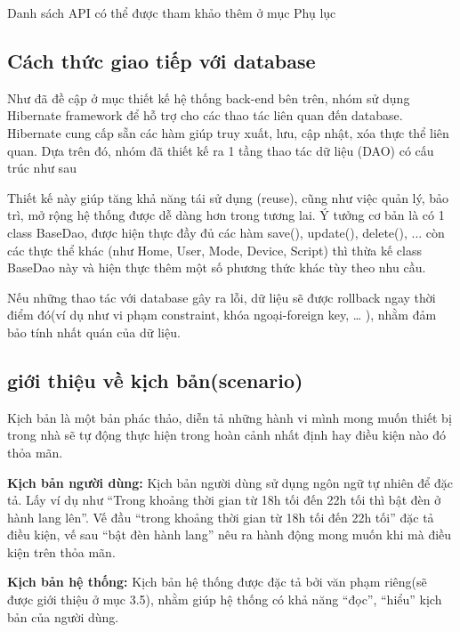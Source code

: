 \documentclass[11pt,a4paper,oneside]{book}
\begin{document}
Danh sách API có thể được tham khảo thêm ở mục Phụ lục

\subsection{Cách thức giao tiếp với database}
Như đã đề cập ở mục thiết kế hệ thống back-end bên trên, nhóm sử dụng Hibernate framework để hỗ trợ cho các thao tác liên quan đến database. Hibernate cung cấp sẵn các hàm giúp truy xuất, lưu, cập nhật, xóa thực thể liên quan. Dựa trên đó, nhóm đã thiết kế ra 1 tầng thao tác dữ liệu (DAO) có cấu trúc như sau

%    

Thiết kế này giúp tăng khả năng tái sử dụng (reuse), cũng như việc quản lý, bảo trì, mở rộng hệ thống được dễ dàng hơn trong tương lai. Ý tưởng cơ bản là có 1 class BaseDao, được hiện thực đầy đủ các hàm save(), update(), delete(), ... còn các thực thể khác (như Home, User, Mode, Device, Script) thì thừa kế class BaseDao này và hiện thực thêm một số phương thức khác tùy theo nhu cầu.

Nếu những thao tác với database gây ra lỗi, dữ liệu sẽ được rollback ngay thời điểm đó(ví dụ như vi phạm constraint, khóa ngoại-foreign key, … ), nhằm đảm bảo tính nhất quán của dữ liệu.

\subsection{giới thiệu về kịch bản(scenario)}

Kịch bản là một bản phác thảo, diễn tả những hành vi mình mong muốn thiết bị trong nhà sẽ tự động thực hiện trong hoàn cảnh nhất định hay điều kiện nào đó thỏa mãn. 

\textbf{Kịch bản người dùng:} Kịch bản người dùng sử dụng ngôn ngữ tự nhiên để đặc tả. Lấy ví dụ như “Trong khoảng thời gian từ 18h tối đến 22h tối thì bật đèn ở hành lang lên”. Vế đầu “trong khoảng thời gian từ 18h tối đến 22h tối” đặc tả điều kiện, vế sau “bật đèn hành lang” nêu ra hành động mong muốn khi mà điều kiện trên thỏa mãn.

\textbf{Kịch bản hệ thống:} Kịch bản hệ thống được đặc tả bởi văn phạm riêng(sẽ được giới thiệu ở mục 3.5), nhằm giúp hệ thống có khả năng “đọc”, “hiểu” kịch bản của người dùng.
\end{document}
